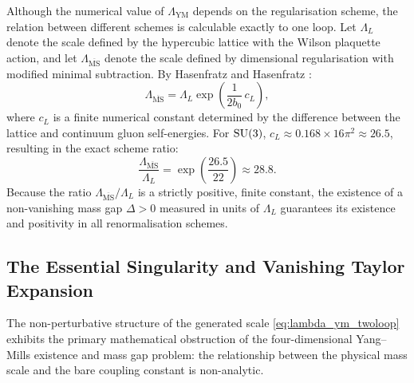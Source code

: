 Although the numerical value of $\Lambda_{\mathrm{YM}}$ depends on the regularisation scheme, the relation between different schemes is calculable exactly to one loop. Let $\Lambda_L$ denote the scale defined by the hypercubic lattice with the Wilson plaquette action, and let $\Lambda_{\overline{\mathrm{MS}}}$ denote the scale defined by dimensional regularisation with modified minimal subtraction. By Hasenfratz and Hasenfratz \cite{Hasenfratz1980}:
\begin{equation}
\label{eq:scheme_conversion}
\Lambda_{\overline{\mathrm{MS}}} = \Lambda_L \exp\left( \frac{1}{2 b_0} \, c_L \right),
\end{equation}
where $c_L$ is a finite numerical constant determined by the difference between the lattice and continuum gluon self-energies. For $\mathrm{SU}(3)$, $c_L \approx 0.168 \times 16\pi^2 \approx 26.5$, resulting in the exact scheme ratio:
\begin{equation}
\label{eq:su3_scheme_ratio}
\frac{\Lambda_{\overline{\mathrm{MS}}}}{\Lambda_L} = \exp\left( \frac{26.5}{22} \right) \approx 28.8.
\end{equation}
Because the ratio $\Lambda_{\overline{\mathrm{MS}}} / \Lambda_L$ is a strictly positive, finite constant, the existence of a non-vanishing mass gap $\Delta > 0$ measured in units of $\Lambda_L$ guarantees its existence and positivity in all renormalisation schemes.

\subsection{The Essential Singularity and Vanishing Taylor Expansion}
\label{subsec:essential_singularity}

The non-perturbative structure of the generated scale \eqref{eq:lambda_ym_twoloop} exhibits the primary mathematical obstruction of the four-dimensional Yang--Mills existence and mass gap problem: the relationship between the physical mass scale and the bare coupling constant is non-analytic.

